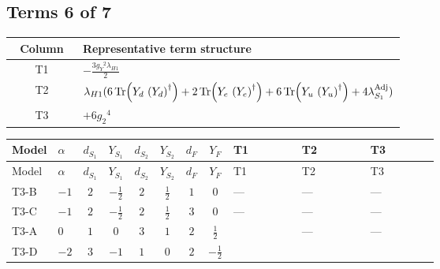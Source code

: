 \documentclass[8pt]{article}
\begin{document}
\begin{landscape}
\subsection*{Terms 6 of 7}
\begin{center}
\begin{tabular}{@{}c >{\raggedright\arraybackslash}p{0.82\linewidth}@{}}
\toprule
Column & Representative term structure \\
\midrule
T1 & \(\displaystyle -\frac{3 {g_Y}^2 {\lambda_{H1}}}{2}\) \\
\midrule
T2 & \(\displaystyle {\lambda_{H1}} (6 \operatorname{Tr}\!\left({Y_d}\,\left({Y_d}\right)^{\dagger}\right)+2 \operatorname{Tr}\!\left({Y_e}\,\left({Y_e}\right)^{\dagger}\right)+6 \operatorname{Tr}\!\left({Y_u}\,\left({Y_u}\right)^{\dagger}\right)+4 {\lambda_{S_1}^{\rm Adj}})\) \\
\midrule
T3 & \(\displaystyle +6 {g_2}^4\) \\
\midrule
\bottomrule
\end{tabular}
\end{center}
\smallskip
\tiny
\begin{longtable}{@{}llcccccc >{\raggedright\arraybackslash}p{0.21\linewidth} >{\raggedright\arraybackslash}p{0.21\linewidth} >{\raggedright\arraybackslash}p{0.21\linewidth}@{}}
\toprule
Model & $\alpha$ & $d_{S_1}$ & $Y_{S_1}$ & $d_{S_2}$ & $Y_{S_2}$ & $d_F$ & $Y_F$ & T1 & T2 & T3 \\
\midrule
\endfirsthead
\toprule
Model & $\alpha$ & $d_{S_1}$ & $Y_{S_1}$ & $d_{S_2}$ & $Y_{S_2}$ & $d_F$ & $Y_F$ & T1 & T2 & T3 \\
\midrule
\endhead
T3-B & $-1$ & $2$ & $-\frac{1}{2}$ & $2$ & $\frac{1}{2}$ & $1$ & $0$ & --- & --- & --- \\
\midrule
T3-C & $-1$ & $2$ & $-\frac{1}{2}$ & $2$ & $\frac{1}{2}$ & $3$ & $0$ & --- & --- & --- \\
\midrule
T3-A & $0$ & $1$ & $0$ & $3$ & $1$ & $2$ & $\frac{1}{2}$ & \scriptsize\adjustbox{max width=\linewidth}{$\begin{gathered} -\frac{3 {g_Y}^2 {\lambda_{H1}}}{2}\end{gathered}$} & --- & --- \\
\midrule
T3-D & $-2$ & $3$ & $-1$ & $1$ & $0$ & $2$ & $-\frac{1}{2}$ & \scriptsize\adjustbox{max width=\linewidth}{$\begin{gathered} -\frac{15 {g_Y}^2 {\lambda_{H1}}}{2}\end{gathered}$} & \scriptsize\adjustbox{max width=\linewidth}{$\begin{gathered} {\lambda_{H1}} (6 \operatorname{Tr}\!\left({Y_d}\,\left({Y_d}\right)^{\dagger}\right)+2 \operatorname{Tr}\!\left({Y_e}\,\left({Y_e}\right)^{\dagger}\right)+6 \operatorname{Tr}\!\left({Y_u}\,\left({Y_u}\right)^{\dagger}\right)+4 {\lambda_{S_1}^{\rm Adj}})\end{gathered}$} & \scriptsize\adjustbox{max width=\linewidth}{$\begin{gathered} +6 {g_2}^4\end{gathered}$} \\

\end{longtable}
\end{landscape}
\end{document}
